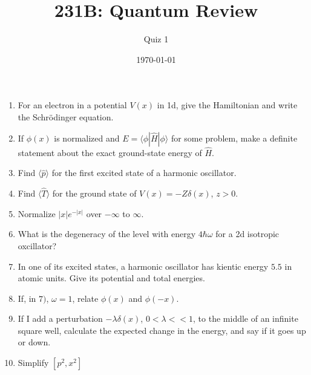 




\title{231B: Quantum Review}
\author{Quiz 1}
\date{\today}
\maketitle

\begin{enumerate}
\item For an electron in a potential $V(x)$ in 1d, give the Hamiltonian
and write the Schr{\"o}dinger equation.
\item If $\phi(x)$ is normalized and $E = \langle \phi|\hat{H}|\phi \rangle$
for some problem, make a definite statement about the exact ground-state energy
of $\hat{H}$.
\item Find $\langle \hat{p} \rangle$ for the first excited state of a
harmonic oscillator.
\item Find $\langle \hat{T} \rangle$ for the ground state of $V(x) = -Z\delta(x)$,
$z>0$.
\item Normalize $|x|e^{-|x|}$ over $-\infty$ to $\infty$.
\item What is the degeneracy of the level with energy $4\hbar \omega$ for a 2d
isotropic oxcillator?
\item In one of its excited states, a harmonic oscillator has kientic energy
$5.5$ in atomic units. Give its potential and total energies.
\item If, in $7)$, $\omega=1$, relate $\phi(x)$ and $\phi(-x)$.
\item If I add a perturbation $-\lambda\delta(x)$, $0<\lambda<<1$, to the
middle of an infinite square well, calculate the expected change in the
energy, and say if it goes up or down.
\item Simplify $[p^2,x^2]$   
\end{enumerate}

